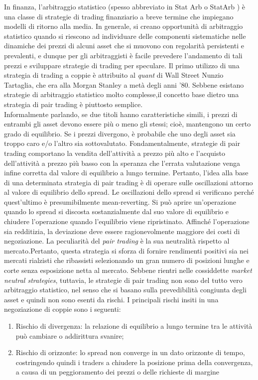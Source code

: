 \documentclass[]{article}
\begin{document}
In finanza, l'arbitraggio statistico (spesso abbreviato in Stat Arb o StatArb ) è una classe di strategie di trading finanziario a breve termine che impiegano modelli di ritorno alla media.
In generale, si creano opportunità di arbitraggio statistico quando si riescono ad individuare delle componenti sistematiche nelle dinamiche dei prezzi di alcuni asset che si muovono con regolarità persistenti e prevalenti, e dunque per gli arbitraggisti  è facile prevedere l’andamento di tali prezzi e sviluppare strategie di trading per speculare. 
Il primo utilizzo di una strategia di trading a coppie è attribuito al \textit{quant} di Wall Street Nunzio Tartaglia, che era alla Morgan Stanley a metà degli anni '80.
Sebbene esistano strategie di arbitraggio statistico molto complesse,il concetto base dietro una strategia di pair trading è piuttosto semplice.
\\
Informalmente parlando, se due titoli hanno caratteristiche simili, i prezzi di entrambi gli asset devono essere più o meno gli stessi; cioè, mantengono un certo grado di equilibrio. Se i prezzi divergono, è probabile che uno degli asset sia troppo caro e/o l'altro sia sottovalutato. Fondamentalmente, strategie di pair trading comportano la vendita dell'attività a prezzo più alto e l'acquisto dell'attività a prezzo più basso con la speranza che l'errata valutazione venga infine corretta dal valore di equilibrio a lungo termine. Pertanto, l'idea alla base di una determinata strategia di pair trading è di operare sulle oscillazioni attorno al valore di equilibrio dello spread. Le oscillazioni dello spread si verificano perché quest'ultimo è presumibilmente mean-reverting. Si può aprire un'operazione quando lo spread si discosta sostanzialmente dal suo valore di equilibrio e chiudere l'operazione quando l'equilibrio viene ripristinato. Affinché l'operazione sia redditizia, la deviazione deve essere ragionevolmente maggiore dei costi di negoziazione.
La peculiarità del \textit{pair trading} è la sua neutralità rispetto al mercato.Pertanto, questa strategia si sforza di fornire rendimenti positivi sia nei mercati rialzisti che ribassisti selezionando un gran numero di posizioni lunghe e corte senza esposizione netta al mercato. 
Sebbene rientri nelle cossiddette \textit{market neutral strategies},
tuttavia, le strategie di pair trading non sono del tutto vero arbitraggio statistico, nel senso che si basano sulla prevedibilità congiunta degli asset e quindi non sono esenti da rischi.
I principali rischi insiti in una negoziazione di coppie sono i seguenti: 
\begin{enumerate}
	\item Rischio di divergenza: la relazione di equilibrio a lungo termine tra le attività può cambiare o addirittura svanire; 
	\item Rischio di orizzonte: lo spread non converge in un dato orizzonte di tempo, costringendo quindi i traders a chiudere la posizione prima della convergenza, a causa di un peggioramento dei prezzi o delle richieste di margine 
\end{enumerate}
\end{document}
